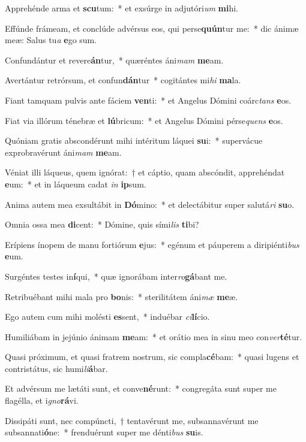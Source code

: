\item Apprehénde arma et \textbf{scu}tum:~* et exsúrge in adjutóri\textit{um} \textbf{mi}hi.
\item Effúnde frámeam, et conclúde advérsus eos, qui perse\textbf{quún}tur me:~* dic ánimæ meæ: Salus tu\textit{a} \textbf{e}go sum.
\item Confundántur et revere\textbf{án}tur,~* quæréntes áni\textit{mam} \textbf{me}am.
\item Avertántur retrórsum, et confun\textbf{dán}tur~* cogitántes mi\textit{hi} \textbf{ma}la.
\item Fiant tamquam pulvis ante fáciem \textbf{ven}ti:~* et Angelus Dómini coárc\textit{tans} \textbf{e}os.
\item Fiat via illórum ténebræ et \textbf{lú}bricum:~* et Angelus Dómini pérse\textit{quens} \textbf{e}os.
\item Quóniam gratis abscondérunt mihi intéritum láquei \textbf{su}i:~* supervácue exprobravérunt áni\textit{mam} \textbf{me}am.
\item Véniat illi láqueus, quem ignórat:~† et cáptio, quam abscóndit, apprehéndat \textbf{e}um:~* et in láqueum cadat \textit{in} \textbf{ip}sum.
\item Anima autem mea exsultábit in \textbf{Dó}mino:~* et delectábitur super salutá\textit{ri} \textbf{su}o.
\item Omnia ossa mea \textbf{di}cent:~* Dómine, quis sími\textit{lis} \textbf{ti}bi?
\item Erípiens ínopem de manu fortiórum \textbf{e}jus:~* egénum et páuperem a diripiénti\textit{bus} \textbf{e}um.
\item Surgéntes testes in\textbf{í}qui,~* quæ ignorábam inter\textit{ro}\textbf{gá}bant me.
\item Retribuébant mihi mala pro \textbf{bo}nis:~* sterilitátem áni\textit{mæ} \textbf{me}æ.
\item Ego autem cum mihi molésti \textbf{es}sent,~* induébar \textit{ci}\textbf{lí}cio.
\item Humiliábam in jejúnio ánimam \textbf{me}am:~* et orátio mea in sinu meo con\textit{ver}\textbf{té}tur.
\item Quasi próximum, et quasi fratrem nostrum, sic compla\textbf{cé}bam:~* quasi lugens et contristátus, sic humi\textit{li}\textbf{á}bar.
\item Et advérsum me lætáti sunt, et conve\textbf{né}runt:~* congregáta sunt super me flagélla, et i\textit{gno}\textbf{rá}vi.
\item Dissipáti sunt, nec compúncti,~† tentavérunt me, subsannavérunt me subsannati\textbf{ó}ne:~* frenduérunt super me dénti\textit{bus} \textbf{su}is.

